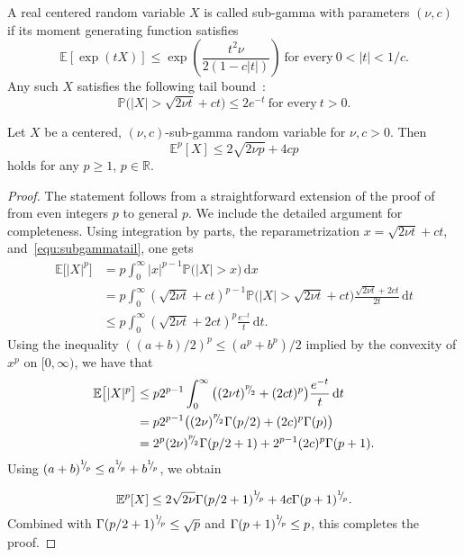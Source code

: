 A real centered random variable $X$ is called sub-gamma with parameters $(\nu,c)$ if its moment generating function satisfies
\begin{equation*}
 \mathbb E[ \exp( tX ) ] \le \exp\left( \frac{ t^2 \nu}{2(1-c|t|)} \right) \ \text{for every} \ 0 < |t| < 1/c.
\end{equation*}
Any such $X$ satisfies the following tail bound~\cite[P. 29]{boucheron-2013-concentration-inequalities}:
\begin{equation}
  \mathbb P\big(|X| > \sqrt{2\nu t} + ct\big) \le 2 e^{-t} \ \text{for every} \ t>0.
  \label{equ:subgammatail}
\end{equation}

\begin{lemma}\label{lem:sub-gamma-moments}
    Let $X$ be a centered, $(\nu,c)$-sub-gamma random variable for $\nu,c>0$. Then
    \begin{equation*}
        \mathbb{E}^p[X] \leq 2 \sqrt{2 \nu p} + 4 c p
    \end{equation*}
    holds for any $p \geq 1$, $p \in \mathbb{R}$.
\end{lemma}
\begin{proof}
The statement follows from a straightforward extension of the proof of~\cite[Theorem 2.3]{boucheron-2013-concentration-inequalities} from  even integers $p$ to general $p$. We include the detailed argument for completeness. Using integration by parts, the reparametrization $x = \sqrt{2\nu t} + ct$, and~\cref{equ:subgammatail}, one gets
\begin{align*}
 \mathbb{E}\big[|X|^p\big] &= p \int_0^\infty  |x|^{p-1} \mathbb P\big(|X| > x\big) \,\mathrm{d}x \\
 &=  p \int_0^\infty  (\sqrt{2\nu t} + ct)^{p-1} \mathbb P\big(|X| > \sqrt{2\nu t} + ct \big) \frac{ \sqrt{2\nu t} + 2ct}{2t} \,\mathrm{d}t \\
 &\le p  \int_0^\infty  (\sqrt{2\nu t} + 2ct)^{p}  \frac{e^{-t}}{t} \,\mathrm{d}t.
\end{align*}
Using the inequality $( (a+b)/2 )^p \le (a^p + b^p)/2$ implied by the convexity of $x^p$ on $[0,\infty)$,
we have that
\begin{align*}
 \mathbb{E}\big[|X|^p\big] & \le 
 p 2^{p-1}   \int_0^\infty  \big( (2\nu t)^{{}^{p}{\mskip -5mu/\mskip -3mu}_{2}} + (2ct)^{p}\big)  \frac{e^{-t}}{t} \,\mathrm{d}t \\
 &= p 2^{p-1} \big( (2\nu)^{{}^{p}{\mskip -5mu/\mskip -3mu}_{2}} \Gamma(p/2) + (2c)^p  \Gamma(p) \big) \\
 &= 2^{p} (2\nu)^{{}^{p}{\mskip -5mu/\mskip -3mu}_{2}} \Gamma(p/2+1) + 2^{p-1} (2c)^p  \Gamma(p+1).
\end{align*}
Using $(a+b)^{{}^{1}{\mskip -5mu/\mskip -3mu}_{p}} \le a^{{}^{1}{\mskip -5mu/\mskip -3mu}_{p}} + b^{{}^{1}{\mskip -5mu/\mskip -3mu}_{p}}$, we obtain

\begin{equation*}
\mathbb{E}^p[X] \leq 2 \sqrt{2\nu} \Gamma(p/2+1)^{{}^{1}{\mskip -5mu/\mskip -3mu}_{p}}  + 4 c \Gamma(p+1)^{{}^{1}{\mskip -5mu/\mskip -3mu}_{p}}.
\end{equation*}
Combined with $\Gamma(p/2+1)^{{}^{1}{\mskip -5mu/\mskip -3mu}_{p}} \le \sqrt{p}$ and $\Gamma(p+1)^{{}^{1}{\mskip -5mu/\mskip -3mu}_{p}} \le p$, this completes the proof.
\end{proof}





